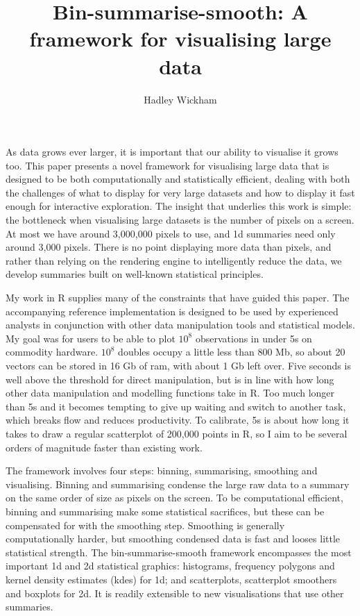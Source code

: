 \documentclass[journal]{vgtc}                %
\title{Bin-summarise-smooth: A framework for visualising large data}
\author{Hadley Wickham}
\begin{document}

\maketitle

As data grows ever larger, it is important that our ability to visualise it grows too. This paper presents a novel framework for visualising large data that is designed to be both computationally and statistically efficient, dealing with both the challenges of what to display for very large datasets and how to display it fast enough for interactive exploration. The insight that underlies this work is simple: the bottleneck when visualising large datasets is the number of pixels on a screen. At most we have around 3,000,000 pixels to use, and 1d summaries need only around 3,000 pixels. There is no point displaying more data than pixels, and rather than relying on the rendering engine to intelligently reduce the data, we develop summaries built on well-known statistical principles. 

My work in R supplies many of the constraints that have guided this paper. The accompanying reference implementation is designed to be used by experienced analysts in conjunction with other data manipulation tools and statistical models. My goal was for users to be able to plot $10^8$ observations in under 5s on commodity hardware. $10^8$ doubles occupy a little less than 800 Mb, so about 20 vectors can be stored in 16 Gb of ram, with about 1 Gb left over. Five seconds is well above the threshold for direct manipulation, but is in line with how long other data manipulation and modelling functions take in R. Too much longer than 5s and it becomes tempting to give up waiting and switch to another task, which breaks flow and reduces productivity. To calibrate, 5s is about how long it takes to draw a regular scatterplot of 200,000 points in R, so I aim to be several orders of magnitude faster than existing work.

The framework involves four steps: binning, summarising, smoothing and visualising. Binning and summarising condense the large raw data to a summary on the same order of size as pixels on the screen. To be computational efficient, binning and summarising make some statistical sacrifices, but these can be compensated for with the smoothing step. Smoothing is generally computationally harder, but smoothing condensed data is fast and looses little statistical strength. The bin-summarise-smooth framework encompasses the most important 1d and 2d statistical graphics: histograms, frequency polygons and kernel density estimates (kdes) for 1d; and scatterplots, scatterplot smoothers and boxplots for 2d. It is readily extensible to new visualisations that use other summaries.
\end{document}
